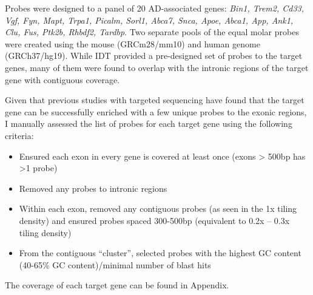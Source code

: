 
Probes were designed to a panel of 20 AD-associated genes: \textit{Bin1, Trem2, Cd33, Vgf, Fyn, Mapt, Trpa1, Picalm, Sorl1, Abca7, Snca, Apoe, Abca1, App, Ank1, Clu, Fus, Ptk2b, Rhbdf2, Tardbp}. Two separate pools of the equal molar probes were created using the mouse (GRCm28/mm10) and human genome (GRCh37/hg19). While IDT provided a pre-designed set of probes to the target genes, many of them were found to overlap with the intronic regions of the target gene with contiguous coverage. 

Given that previous studies with targeted sequencing have found that the target gene can be successfully enriched with a few unique probes to the exonic regions, I manually assessed the list of probes for each target gene using the following criteria:
\begin{itemize}
	\item Ensured each exon in every gene is covered at least once (exons > 500bp has >1 probe) 
	\item Removed any probes to intronic regions
	\item Within each exon, removed any contiguous probes (as seen in the 1x tiling density) and ensured probes spaced 300-500bp (equivalent to 0.2x – 0.3x tiling density) 
	\item From the contiguous “cluster”, selected probes with the highest GC content (40-65\% GC content)/minimal number of blast hits 
\end{itemize}
The coverage of each target gene can be found in Appendix. 

